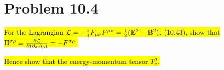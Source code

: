 \documentclass{article}
\begin{document}
\section*{Problem 10.4}
\begin{quoting}
    \hl{For the Lagrangian $\mathcal{L}=-\frac{1}{4}F_{\mu\nu}F^{\mu\nu}=\frac{1}{2}(\vb{E}^2-\vb{B}^2)$, (10.43), show that $\Pi^{\sigma\rho}\equiv\pdv{\mathcal{L}}{(\partial_\sigma A_\rho)}=-F^{\sigma\rho}$.}
    
    \hl{Hence show that the energy-momentum tensor $T^\mu_\nu$.}
\end{quoting}
\end{document}
